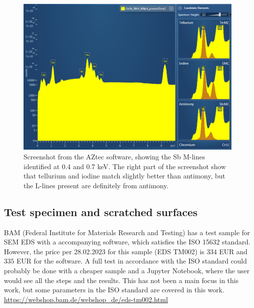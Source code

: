 \begin{figure}[htbp]
    \centering
    \includegraphics[width=0.99\linewidth]{figures/discussion/AZtec_Mlines.png}
    \caption{
        Screenshot from the AZtec software, showing the Sb M-lines identified at 0.4 and 0.7 keV.
        The right part of the screenshot show that tellurium and iodine match slightly better than antimony, but the L-lines present are definitely from antimony.
    }
    \label{fig:discussion:AZtec_Mlines}
\end{figure}





\subsection{Test specimen and scratched surfaces}
\label{discussion:test_specimen}




BAM (Federal Institute for Materials Research and Testing) has a test sample for SEM EDS with a accompanying software, which satisfies the ISO 15632 standard.
However, the price per 28.02.2023 for this sample (EDS TM002) is $334$ EUR and $335$ EUR for the software.
A full test in accordance with the ISO standard could probably be done with a cheaper sample and a Jupyter Notebook, where the user would see all the steps and the results.
This has not been a main focus in this work, but some parameters in the ISO standard are covered in this work.
\url{https://webshop.bam.de/webshop_de/eds-tm002.html}

